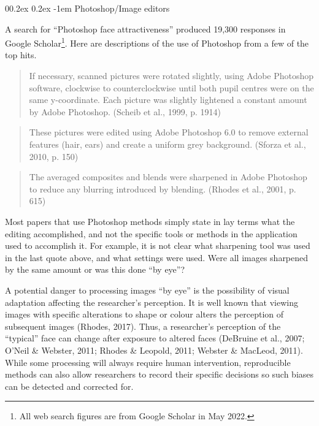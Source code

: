 \documentclass[
  doc,floatsintext]{apa6}
\makeatletter
\let\oldparagraph\paragraph
\renewcommand{\paragraph}[1]{\oldparagraph{#1}\mbox{}}
\renewcommand{\paragraph}{\@startsection{paragraph}{4}{\parindent}%
  {0\baselineskip \@plus 0.2ex \@minus 0.2ex}%
  {-1em}%
  {\normalfont\normalsize\bfseries\itshape\typesectitle}}
\makeatother
\begin{document}
\hypertarget{photoshopimage-editors}{%
\paragraph{Photoshop/Image editors}\label{photoshopimage-editors}}

A search for ``Photoshop face attractiveness'' produced 19,300 responses in Google Scholar\footnote{All web search figures are from Google Scholar in May 2022.}. Here are descriptions of the use of Photoshop from a few of the top hits.

\begin{quote}
If necessary, scanned pictures were rotated slightly, using Adobe Photoshop software, clockwise to counterclockwise until both pupil centres were on the same y-coordinate. Each picture was slightly lightened a constant amount by Adobe Photoshop. (Scheib et al., 1999, p. 1914)
\end{quote}

\begin{quote}
These pictures were edited using Adobe Photoshop 6.0 to remove external features (hair, ears) and create a uniform grey background. (Sforza et al., 2010, p. 150)
\end{quote}

\begin{quote}
The averaged composites and blends were sharpened in Adobe Photoshop to reduce any blurring introduced by blending. (Rhodes et al., 2001, p. 615)
\end{quote}

Most papers that use Photoshop methods simply state in lay terms what the editing accomplished, and not the specific tools or methods in the application used to accomplish it. For example, it is not clear what sharpening tool was used in the last quote above, and what settings were used. Were all images sharpened by the same amount or was this done ``by eye''?

A potential danger to processing images ``by eye'' is the possibility of visual adaptation affecting the researcher's perception. It is well known that viewing images with specific alterations to shape or colour alters the perception of subsequent images (Rhodes, 2017). Thus, a researcher's perception of the ``typical'' face can change after exposure to altered faces (DeBruine et al., 2007; O'Neil \& Webster, 2011; Rhodes \& Leopold, 2011; Webster \& MacLeod, 2011). While some processing will always require human intervention, reproducible methods can also allow researchers to record their specific decisions so such biases can be detected and corrected for.
\end{document}

